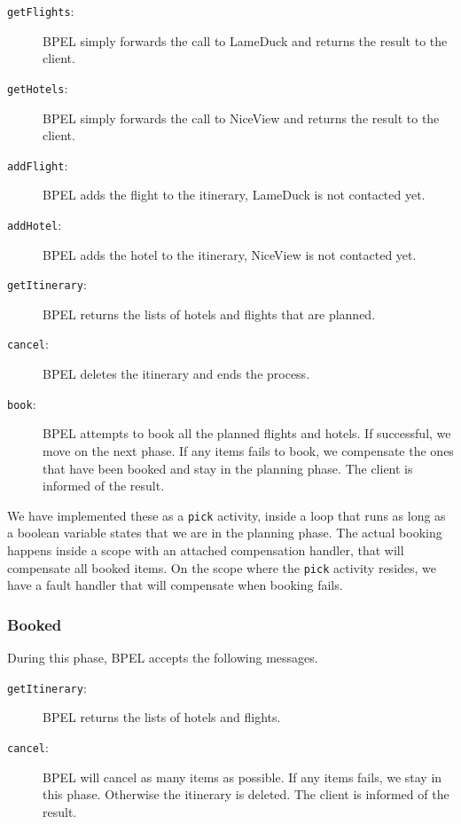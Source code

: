 
\begin{description}
\item [\texttt{getFlights}:] BPEL simply forwards the call to LameDuck and returns the result to the client.
\item [\texttt{getHotels}:] BPEL simply forwards the call to NiceView and returns the result to the client.
\item [\texttt{addFlight}:] BPEL adds the flight to the itinerary, LameDuck is not contacted yet.
\item [\texttt{addHotel}:] BPEL adds the hotel to the itinerary, NiceView is not contacted yet.
\item [\texttt{getItinerary}:] BPEL returns the lists of hotels and flights that are planned.
\item [\texttt{cancel}:] BPEL deletes the itinerary and ends the process.
\item [\texttt{book}:] BPEL attempts to book all the planned flights and hotels. If successful, we move on the next phase. If any items fails to book, we compensate the ones that have been booked and stay in the planning phase. The client is informed of the result.
\end{description}

We have implemented these as a \texttt{pick} activity, inside a loop that runs as long as a boolean variable states that we are in the planning phase. The actual booking happens inside a scope with an attached compensation handler, that will compensate all booked items. On the scope where the \texttt{pick} activity resides, we have a fault handler that will compensate when booking fails.

\subsubsection{Booked}
During this phase, BPEL accepts the following messages.


\begin{description}
\item [\texttt{getItinerary}:] BPEL returns the lists of hotels and flights.
\item [\texttt{cancel}:] BPEL will cancel as many items as possible. If any items fails, we stay in this phase. Otherwise the itinerary is deleted. The client is informed of the result.
\end{description}
